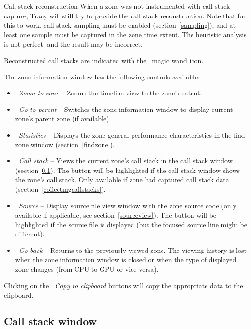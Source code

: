 \documentclass[hidelinks,titlepage,a4paper,twoside]{article}
\begin{document}
\begin{bclogo}[
noborder=true,
couleur=black!5,
logo=\bclampe
]{Call stack reconstruction}
When a zone was not instrumented with call stack capture, Tracy will still try to provide the call stack reconstruction. Note that for this to work, call stack sampling must be enabled (section~\ref{sampling}), and at least one sample must be captured in the zone time extent. The heuristic analysis is not perfect, and the result may be incorrect.

Reconstructed call stacks are indicated with the \faWandSparkles~magic wand icon.
\end{bclogo}

The zone information window has the following controls available:

\begin{itemize}
\item \emph{\faMicroscope{}~Zoom to zone} -- Zooms the timeline view to the zone's extent.
\item \emph{\faArrowUp{}~Go to parent} -- Switches the zone information window to display current zone's parent zone (if available).
\item \emph{\faChartBar{}~Statistics} -- Displays the zone general performance characteristics in the find zone window (section~\ref{findzone}).
\item \emph{\faAlignJustify{}~Call stack} -- Views the current zone's call stack in the call stack window (section~\ref{callstackwindow}). The button will be highlighted if the call stack window shows the zone's call stack. Only available if zone had captured call stack data (section~\ref{collectingcallstacks}).
\item \emph{\faFile{}~Source} -- Display source file view window with the zone source code (only available if applicable, see section~\ref{sourceview}). The button will be highlighted if the source file is displayed (but the focused source line might be different).
\item \emph{\faArrowLeft{}~Go back} -- Returns to the previously viewed zone. The viewing history is lost when the zone information window is closed or when the type of displayed zone changes (from CPU to GPU or vice versa).
\end{itemize}

Clicking on the \emph{\faClipboard{}~Copy to clipboard} buttons will copy the appropriate data to the clipboard.

\subsection{Call stack window}
\label{callstackwindow}
\end{document}
